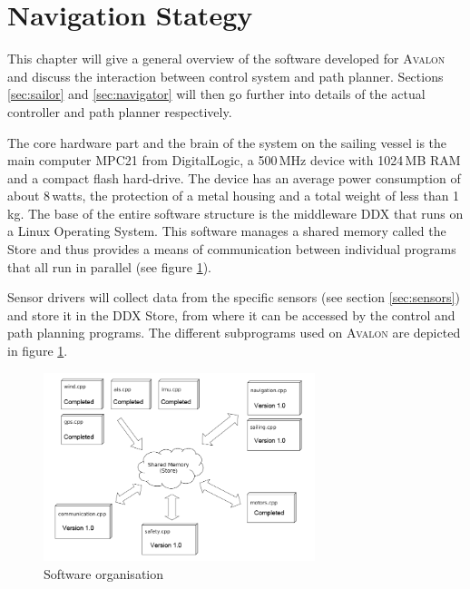 \section{Navigation Stategy}
This chapter will give a general overview of the software developed for
\textsc{Avalon} and discuss the interaction between control system and path
planner. Sections \ref{sec:sailor} and \ref{sec:navigator} will then go further
into details of the actual controller and path planner respectively.

The core hardware part and the brain of the system on the sailing vessel is the
main computer MPC21 from {\sc DigitalLogic}, a 500\,MHz device with 1024\,MB
RAM and a compact flash hard-drive. The device has an average power consumption
of about 8\,watts, the protection of a metal housing and a total weight of less
than 1\,kg.
%
The base of the entire software structure is the middleware DDX\cite{ddxpaper}
that runs on a Linux Operating System. This software manages a shared memory
called the Store and thus provides a means of communication between individual
programs that all run in parallel (see figure \ref{fig:ddx}). 

Sensor drivers will collect data from the specific sensors (see section
\ref{sec:sensors}) and store it in the DDX Store, from where it can be accessed
by the control and path planning programs.
% 
The different subprograms used on \textsc{Avalon} are depicted in figure
\ref{fig:ddx}.

\begin{figure}[htb]
\centering
\includegraphics[height=5.5cm]{pics/RE_ddxplain.png}
\caption{Software organisation} \label{fig:ddx}
\end{figure}

